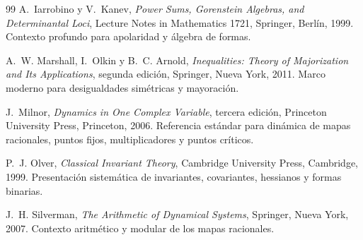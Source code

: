 \documentclass[11pt,oneside]{scrartcl}
\theoremstyle{plainblue}
\theoremstyle{definitionblue}
\theoremstyle{remarkgray}
\begin{document}
\begin{thebibliography}{99}
A.~Iarrobino y V.~Kanev,
\emph{Power Sums, Gorenstein Algebras, and Determinantal Loci},
Lecture Notes in Mathematics 1721, Springer, Berlín, 1999.
\newblock Contexto profundo para apolaridad y álgebra de formas.

A.~W. Marshall, I.~Olkin y B.~C. Arnold,
\emph{Inequalities: Theory of Majorization and Its Applications},
segunda edición, Springer, Nueva York, 2011.
\newblock Marco moderno para desigualdades simétricas y mayoración.

J.~Milnor,
\emph{Dynamics in One Complex Variable}, tercera edición,
Princeton University Press, Princeton, 2006.
\newblock Referencia estándar para dinámica de mapas racionales, puntos fijos, multiplicadores y puntos críticos.

P.~J. Olver,
\emph{Classical Invariant Theory},
Cambridge University Press, Cambridge, 1999.
\newblock Presentación sistemática de invariantes, covariantes, hessianos y formas binarias.

J.~H. Silverman,
\emph{The Arithmetic of Dynamical Systems},
Springer, Nueva York, 2007.
\newblock Contexto aritmético y modular de los mapas racionales.

\end{thebibliography}

\vfill
\begin{center}
\end{center}
\end{document}
